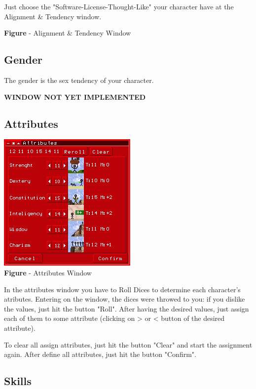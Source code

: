 \documentclass[ letterpaper,12pt]{article}
\begin{document}
Just choose the "Software-License-Thought-Like" your character have at the
Alignment \& Tendency window.

\begin{center}
{\bf Figure} - Alignment \& Tendency Window
\end{center}

\subsection{Gender}

The gender is the sex tendency of your character.

{\bf WINDOW NOT YET IMPLEMENTED}

\subsection{Attributes}

\begin{center}
  \includegraphics{attWindow.png}
\\{\bf Figure} - Attributes Window
\end{center}

In the attributes window you have to Roll Dices to determine each character's
atributes. Entering on the window, the dices were throwed to you: if you
dislike the values, just hit the button "Roll".  After having the desired
values, just assign each of them to some attribute (clicking on > or < button
of the desired attribute). 

To clear all assign attributes, just hit the button "Clear" and start the
assignment again. After define all attributes, just hit the button "Confirm".

\subsection{Skills}
\end{document}

